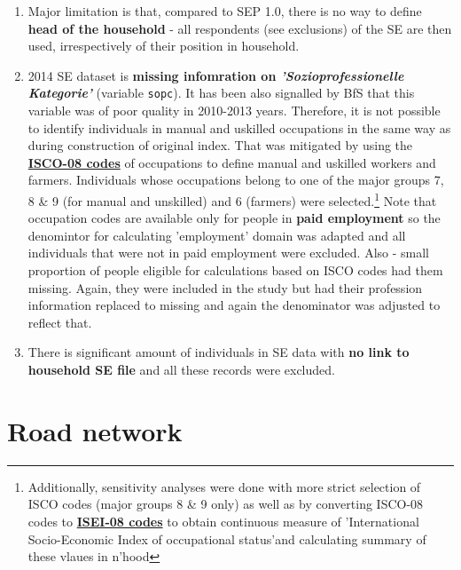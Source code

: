 \documentclass[a4paper, notitlepage, fleqn]{article} %
\begin{document}
\begin{enumerate}

	\item Major limitation is that, compared to SEP 1.0, there is no way to define \textbf{head of the household} - 
		all respondents (see exclusions) of the SE are then used, irrespectively of their position in household.
		
	\item 2014 SE dataset is \textbf{missing infomration on \textit{'Sozioprofessionelle Kategorie'}} (variable \texttt{sopc}).  
		It has been also signalled by BfS that this variable was of poor quality in 2010-2013 years. 
		Therefore, it is not possible to identify individuals in manual and uskilled occupations in the same way as during 
		construction of original index. That was mitigated by using the 
		\href{http://www.ilo.org/public/english/bureau/stat/isco/isco08/index.htm}{\textbf{ISCO-08 codes}} of occupations 
		to define manual and uskilled workers and farmers.
		Individuals whose occupations belong to one of the major groups 7, 8 \& 9 (for manual and unskilled) and 6 (farmers) were selected.\footnote{Additionally, 
		sensitivity analyses were done with more strict selection of ISCO codes (major groups 8 \& 9 only) as well as 	
		by converting ISCO-08 codes to \href{http://www.harryganzeboom.nl/isco08/qa-isei-08.htm}{\textbf{ISEI-08 codes}} 
		to obtain continuous measure of 'International Socio-Economic Index of occupational status'and calculating summary of these vlaues in n'hood} 				
		Note that occupation codes are available only for people in \textbf{paid employment} so the denomintor 
		for calculating 'employment' domain was adapted and all individuals that were not in paid employment were excluded.	
		Also - small proportion of people eligible for calculations based on ISCO codes had them missing. Again, they were included in the study
		but had their profession information replaced to missing and again the denominator was adjusted to reflect that.
		
	\item There is significant amount of individuals in SE data with \textbf{no link to household SE file} and all these records were excluded. 
	
\end{enumerate}
\newpage
\section{Road network}
\end{document}
